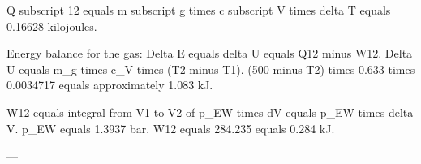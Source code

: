 Q subscript 12 equals m subscript g times c subscript V times delta T equals 0.16628 kilojoules.

Energy balance for the gas:  
Delta E equals delta U equals Q12 minus W12.  
Delta U equals m_g times c_V times (T2 minus T1).  
(500 minus T2) times 0.633 times 0.0034717 equals approximately 1.083 kJ.  

W12 equals integral from V1 to V2 of p_EW times dV equals p_EW times delta V.  
p_EW equals 1.3937 bar.  
W12 equals 284.235 equals 0.284 kJ.  

---